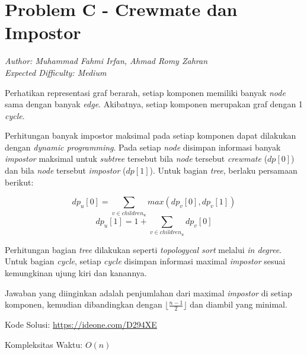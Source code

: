 \usepackage{tikz}

\section*{Problem C - Crewmate dan Impostor}
\textit{Author: Muhammad Fahmi Irfan, Ahmad Romy Zahran}
\\
\textit{Expected Difficulty: Medium}

Perhatikan representasi graf berarah, setiap komponen memiliki banyak \textit{node} sama dengan banyak \textit{edge}. Akibatnya, setiap komponen merupakan graf dengan 1 \textit{cycle}. 

Perhitungan banyak impostor maksimal pada setiap komponen dapat dilakukan dengan \textit{dynamic programming}. Pada setiap \textit{node} disimpan informasi banyak \textit{impostor} maksimal untuk \textit{subtree} tersebut bila \textit{node} tersebut \textit{crewmate} ($dp[0]$) dan bila \textit{node} tersebut \textit{impostor} ($dp[1]$). Untuk bagian \textit{tree}, berlaku persamaan berikut:

$$ dp_u[0] = \sum_{v \in children_u} max(dp_v[0],dp_v[1]) $$
$$ dp_u[1] = 1 + \sum_{v \in children_u} dp_v[0] $$

\begin{center}
\end{center}

Perhitungan bagian \textit{tree} dilakukan seperti \textit{topologycal sort} melalui \textit{in degree}. Untuk bagian \textit{cycle}, setiap \textit{cycle} disimpan informasi maximal \textit{impostor} sesuai kemungkinan ujung kiri dan kanannya.

\begin{center}
\end{center}

Jawaban yang diinginkan adalah penjumlahan dari maximal \textit{impostor} di setiap komponen, kemudian dibandingkan dengan $\lfloor \frac{n-1}{2} \rfloor$ dan diambil yang minimal.

Kode Solusi: \url{https://ideone.com/D294XE}

Kompleksitas Waktu: $O(n)$